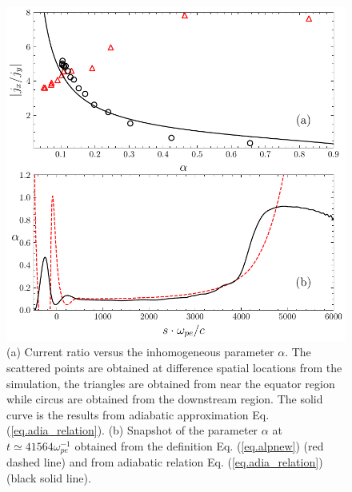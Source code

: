 \begin{figure}
    \centering
    \includegraphics[scale=0.5]{img/alpha.pdf}
    \caption{(a) Current ratio versus the inhomogeneous parameter $\alpha$. The scattered points are obtained at difference spatial locations from the simulation, the triangles are obtained from near the equator region while circus are obtained from the downstream region. 
    The solid curve is the results from adiabatic approximation Eq. (\ref{eq.adia_relation}). 
    (b) Snapshot  of the parameter $\alpha$ at $t\simeq41564\omega_{pe}^{-1}$ obtained  from the definition  Eq. (\ref{eq.alpnew}) (red dashed line) and  from adiabatic relation Eq. (\ref{eq.adia_relation}) (black solid line).
    }
    \label{fig.adiabatic}
\end{figure}


